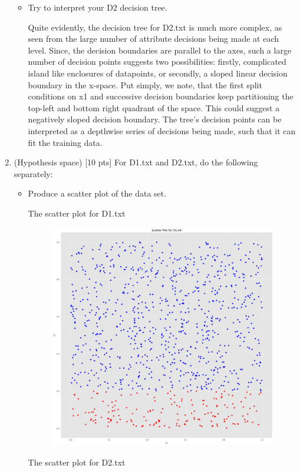 \documentclass[a4paper]{article}
\theoremstyle{definition}
\newenvironment{soln}{
    \leavevmode\color{blue}\ignorespaces
}{}
\begin{document}
\begin{enumerate}
\begin{itemize}
\begin{soln}
  \end{soln}
  \item Try to interpret your D2 decision tree.
  
	\begin{soln}
		Quite evidently, the decision tree for D2.txt is much more complex, as seen from the large number of attribute decisions being made at each level. Since, the decision boundaries are parallel to the axes, such a large number of decision points suggests two possibilities: firstly, complicated island like enclosures of datapoints, or secondly, a sloped linear decision boundary in the x-space. Put simply, we note, that the first split conditions on x1 and successive decision boundaries keep partitioning the top-left and bottom right quadrant of the space. This could suggest a negatively sloped decision boundary. The tree's decision points can be interpreted as a depthwise series of decisions being made, such that it can fit the training data.
	\end{soln}
  \end{itemize}

\item (Hypothesis space)  [10 pts] For D1.txt and D2.txt, do the following separately:
  \begin{itemize}
  \item Produce a scatter plot of the data set.
  
  
    \begin{soln}
	The scatter plot for D1.txt
	\begin{figure}[H]
		\centering
		\includegraphics[width=1.1\textwidth]{D1_scatter.png}
		\captionsetup{labelformat=empty}
		\caption{}
		\label{fig:my_label}
	\end{figure}
	\vspace{0.5cm}
	The scatter plot for D2.txt
	

\end{soln}
\end{itemize}
\end{enumerate}
\end{document}
